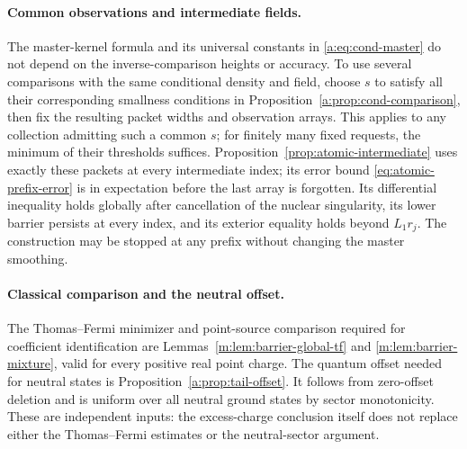\paragraph{Common observations and intermediate fields.}
The master-kernel formula and its universal constants in
\eqref{a:eq:cond-master} do not depend on the inverse-comparison heights
or accuracy. To use several comparisons with the same conditional
density and field, choose $s$ to satisfy all their corresponding
smallness conditions in Proposition~\ref{a:prop:cond-comparison},
then fix the resulting packet widths and observation arrays. This
applies to any collection admitting such a common $s$; for finitely
many fixed requests, the minimum of their thresholds suffices.
Proposition~\ref{prop:atomic-intermediate}
uses exactly these packets at every intermediate index; its error bound
\eqref{eq:atomic-prefix-error} is in expectation before the last array
is forgotten. Its differential inequality holds globally after cancellation
of the nuclear singularity, its lower barrier persists at every index,
and its exterior equality holds beyond $L_1r_j$. The construction may be
stopped at any prefix without changing the master smoothing.

\paragraph{Classical comparison and the neutral offset.}
The Thomas--Fermi minimizer and point-source comparison required for
coefficient identification are Lemmas~\ref{m:lem:barrier-global-tf} and
\ref{m:lem:barrier-mixture}, valid for every positive real point charge.
The quantum offset needed for neutral states is
Proposition~\ref{a:prop:tail-offset}. It follows from zero-offset deletion
and is uniform over all neutral ground states by sector monotonicity.
These are independent inputs: the excess-charge conclusion itself does not
replace either the Thomas--Fermi estimates or the neutral-sector argument.
